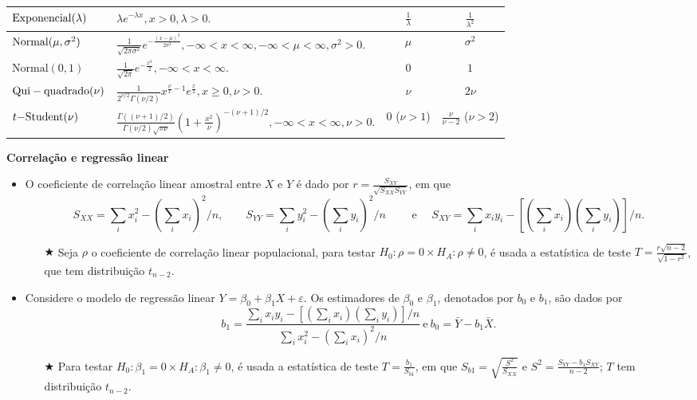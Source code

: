 \documentclass[10pt]{article}%
\begin{document}
\begin{table*}[ht]
\begin{tabular}{@{}llcc@{}}
\midrule
${\rm Exponencial}(\lambda)$ &  $\displaystyle{\lambda e^{-\lambda x}, x > 0, \lambda > 0.}$ & $\displaystyle{\frac{1}{\lambda}}$ & $\displaystyle{\frac{1}{\lambda^2}}$\\
\midrule
${\rm Normal}(\mu, \sigma^2)$ & $\displaystyle{\frac{1}{\sqrt{2\pi\sigma^2}}e^{-\frac{(x-\mu)^2}{2\sigma^2}}, -\infty < x < \infty, -\infty < \mu < \infty,  \sigma^2 > 0.}$& $\mu$ & $\sigma^2$\\
\midrule
$\mbox{Normal}(0, 1)$ & $\displaystyle{\frac{1}{\sqrt{2\pi}}e^{-\frac{x^2}{2}}, -\infty < x < \infty.}$& $0$ & $1$\\
\midrule
${\rm Qui-quadrado}(\nu)$ & $\displaystyle{\frac{1}{2^{\nu/2}\Gamma(\nu/2)}x^{\frac{\nu}{x} - 1}e^{\frac{x}{2}}, x \geq 0, \nu > 0.}$& $\nu$ & $2\nu$\\
\midrule
$t{\rm -Student}(\nu)$ & $\displaystyle{\frac{\Gamma((\nu+1)/2)}{\Gamma(\nu/2)\sqrt{\pi\nu}}\left(1+\frac{x^2}{\nu}\right)^{-(\nu+1)/2}, -\infty < x < \infty, \nu > 0.}$& $0$ ($\nu > 1$)& $\frac{\nu}{\nu - 2}$ ($\nu > 2$)\\
\end{tabular}
\end{table*}

\textbf{Correlação e regressão linear}

\begin{itemize}
\item O coeficiente de correlação linear amostral entre $X$ e $Y$ é dado por $\displaystyle{r = \frac{S_{XY}}{\sqrt{S_{XX}S_{YY}}}}$, em que 
$$
S_{XX} = \sum_i{x_i^2} - (\sum_i{x_i})^2/n, \qquad S_{YY} = \sum_i{y_i^2} - (\sum_i{y_i})^2/n \qquad \mbox{ e } \quad  S_{XY} = \sum_i{x_iy_i} - [(\sum_i{x_i})(\sum_i{y_i})]/n.
$$
\begin{itemize}
\item[$\bigstar$] Seja $\rho$ o coeficiente de correlação linear populacional, para testar $H_0: \rho = 0 \times H_A: \rho \neq 0$, é usada a estatística de teste $T = \frac{r\sqrt{n - 2}}{\sqrt{1 - r^2}}$, que tem distribuição $t_{n-2}$.
\end{itemize}
\item Considere o modelo de regressão linear $Y = \beta_0 + \beta_1 X + \varepsilon$. Os estimadores de $\beta_0$ e $\beta_1$, denotados por $b_0$ e $b_1$, são dados por
$$
b_1 = \frac{\sum_i{x_iy_i} - [(\sum_i{x_i})(\sum_i{y_i})]/n}{\sum_i{x_i^2} - (\sum_i{x_i})^2/n}\ \mbox{e}\ b_0 = \bar{Y} - b_1\bar{X}.
$$
\begin{itemize}
\item[$\bigstar$] Para testar $H_0: \beta_1 = 0 \times H_A: \beta_1 \neq 0$, é usada a estatística de teste $T = \frac{b_1}{S_{b1}}$, em que $S_{b1} = \sqrt{\frac{S^2}{S_{XX}}}$ e $S^2 = \frac{S_{YY} - b_1S_{XY}}{n - 2}$; $T$ tem distribuição $t_{n-2}$.
\end{itemize}
\end{itemize}
\end{document}

